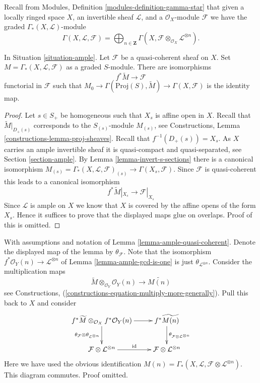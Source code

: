 \noindent
Recall from Modules, Definition \ref{modules-definition-gamma-star}
that given a locally ringed space $X$, an invertible sheaf $\mathcal{L}$,
and a $\mathcal{O}_X$-module $\mathcal{F}$ we have the graded
$\Gamma_*(X, \mathcal{L})$-module
$$
\Gamma(X, \mathcal{L}, \mathcal{F}) =
\bigoplus\nolimits_{n \in \mathbf{Z}}
\Gamma(X, \mathcal{F} \otimes_{\mathcal{O}_X} \mathcal{L}^{\otimes n}).
$$

\begin{lemma}
\label{lemma-ample-quasi-coherent}
In Situation \ref{situation-ample}.
Let $\mathcal{F}$ be a quasi-coherent sheaf on $X$.
Set $M = \Gamma_*(X, \mathcal{L}, \mathcal{F})$ as a graded $S$-module.
There are isomorphisms
$$
f^*\widetilde{M} \longrightarrow \mathcal{F}
$$
functorial in $\mathcal{F}$ such that
$M_0 \to \Gamma(\text{Proj}(S), \widetilde{M}) \to \Gamma(X, \mathcal{F})$
is the identity map.
\end{lemma}

\begin{proof}
Let $s \in S_{+}$ be homogeneous such that $X_s$ is affine open in $X$.
Recall that $\widetilde{M}|_{D_{+}(s)}$ corresponds to the
$S_{(s)}$-module $M_{(s)}$, see
Constructions, Lemma \ref{constructions-lemma-proj-sheaves}.
Recall that $f^{-1}(D_{+}(s)) = X_s$.
As $X$ carries an ample invertible sheaf it is quasi-compact and
quasi-separated, see Section \ref{section-ample}.
By Lemma \ref{lemma-invert-s-sections} there is a canonical isomorphism
$M_{(s)} = \Gamma_*(X, \mathcal{L}, \mathcal{F})_{(s)} \to
\Gamma(X_s, \mathcal{F})$.
Since $\mathcal{F}$ is quasi-coherent this leads to
a canonical isomorphism
$$
f^*\widetilde{M}|_{X_s} \to \mathcal{F}|_{X_s}
$$
Since $\mathcal{L}$ is ample on $X$ we know that $X$ is covered
by the affine opens of the form $X_s$. Hence it suffices to prove
that the displayed maps glue on overlaps. Proof of this is
omitted.
\end{proof}


\begin{remark}
\label{remark-neurotic}
With assumptions and notation of Lemma \ref{lemma-ample-quasi-coherent}.
Denote the displayed map of the lemma by $\theta_{\mathcal{F}}$.
Note that the isomorphism $f^*\mathcal{O}_Y(n) \to \mathcal{L}^{\otimes n}$
of Lemma \ref{lemma-ample-gcd-is-one} is just
$\theta_{\mathcal{L}^{\otimes n}}$.
Consider the multiplication maps 
$$
\widetilde{M} \otimes_{\mathcal{O}_Y} \mathcal{O}_Y(n) 
\longrightarrow
\widetilde{M(n)}
$$
see Constructions, (\ref{constructions-equation-multiply-more-generally}).
Pull this back to $X$ and consider
$$
\xymatrix{
f^*\widetilde{M} \otimes_{\mathcal{O}_X} f^*\mathcal{O}_Y(n)
\ar[r]
\ar[d]_{\theta_{\mathcal{F}} \otimes \theta_{\mathcal{L}^{\otimes n}}}
&
f^*\widetilde{M(n)}
\ar[d]^{\theta_{\mathcal{F}\otimes \mathcal{L}^{\otimes n}}}
\\
\mathcal{F} \otimes \mathcal{L}^{\otimes n} \ar[r]^{\text{id}} &
\mathcal{F} \otimes \mathcal{L}^{\otimes n}
}
$$
Here we have used the obvious identification
$M(n) = \Gamma_*(X, \mathcal{L}, \mathcal{F} \otimes \mathcal{L}^{\otimes n})$.
This diagram commutes. Proof omitted.
\end{remark}



